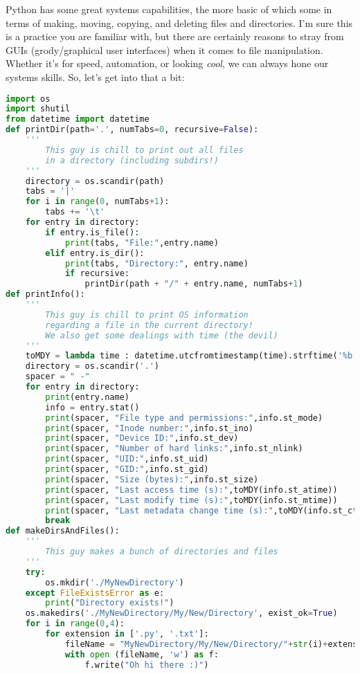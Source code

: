 \documentclass[11pt, twoside, reqno]{book}
\begin{document}
Python has some great systems capabilities, the more basic of which some in terms of making, moving, copying, and deleting files and directories. I'm sure this is a practice you are familiar with, but there are certainly reasons to stray from GUIs (grody/graphical user interfaces) when it comes to file manipulation. Whether it's for speed, automation, or looking \textit{cool}, we can always hone our systems skills. So, let's get into that a bit:
\begin{lstlisting}[language=Python]
import os
import shutil
from datetime import datetime
def printDir(path='.', numTabs=0, recursive=False):
    '''
        This guy is chill to print out all files
        in a directory (including subdirs!)
    '''
    directory = os.scandir(path)
    tabs = '|'
    for i in range(0, numTabs+1):
        tabs += '\t' 
    for entry in directory:
        if entry.is_file():
            print(tabs, "File:",entry.name)
        elif entry.is_dir():
            print(tabs, "Directory:", entry.name)
            if recursive:
                printDir(path + "/" + entry.name, numTabs+1)
def printInfo():
    '''
        This guy is chill to print OS information
        regarding a file in the current directory!
        We also get some dealings with time (the devil)
    '''
    toMDY = lambda time : datetime.utcfromtimestamp(time).strftime('%b %d, %Y - %H:%M:%S')
    directory = os.scandir('.')
    spacer = " -"
    for entry in directory:
        print(entry.name)
        info = entry.stat()
        print(spacer, "File type and permissions:",info.st_mode)
        print(spacer, "Inode number:",info.st_ino)
        print(spacer, "Device ID:",info.st_dev)
        print(spacer, "Number of hard links:",info.st_nlink)
        print(spacer, "UID:",info.st_uid)
        print(spacer, "GID:",info.st_gid)
        print(spacer, "Size (bytes):",info.st_size)
        print(spacer, "Last access time (s):",toMDY(info.st_atime))
        print(spacer, "Last modify time (s):",toMDY(info.st_mtime))
        print(spacer, "Last metadata change time (s):",toMDY(info.st_ctime))
        break
def makeDirsAndFiles():
    '''
        This guy makes a bunch of directories and files
    '''
    try:
        os.mkdir('./MyNewDirectory')
    except FileExistsError as e:
        print("Directory exists!")
    os.makedirs('./MyNewDirectory/My/New/Directory', exist_ok=True)
    for i in range(0,4):
        for extension in ['.py', '.txt']:
            fileName = "MyNewDirectory/My/New/Directory/"+str(i)+extension
            with open (fileName, 'w') as f:
                f.write("Oh hi there :)")

\end{lstlisting}
\end{document}
